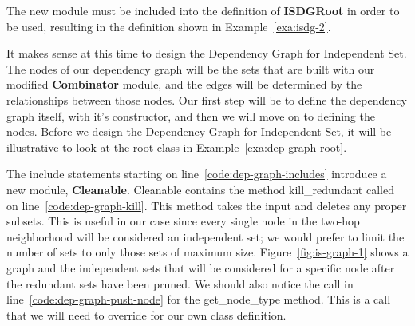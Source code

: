 The new module must be included into the definition of {\bf ISDGRoot} in order to be used, resulting in the definition shown in Example~\ref{exa:isdg-2}. 

  

It makes sense at this time to design the Dependency Graph for Independent Set. The nodes of our dependency graph will be the sets that are built with our modified {\bfseries Combinator} module, and the edges will be determined by the relationships between those nodes. Our first step will be to define the dependency graph itself, with it's constructor, and then we will move on to defining the nodes. Before we design the Dependency Graph for Independent Set, it will be illustrative to look at the root class in Example~\ref{exa:dep-graph-root}.



The {\ttfamily include} statements starting on line~\ref{code:dep-graph-includes} introduce a new module, {\bfseries Cleanable}. Cleanable contains the method {\ttfamily kill\_redundant} called on line~\ref{code:dep-graph-kill}. This method takes the input and deletes any proper subsets. This is useful in our case since every single node in the two-hop neighborhood will be considered an independent set; we would prefer to limit the number of sets to only those sets of maximum size. Figure~\ref{fig:is-graph-1} shows a graph and the independent sets that will be considered for a specific node after the redundant sets have been pruned. We should also notice the call in line~\ref{code:dep-graph-push-node} for the {\ttfamily get\_node\_type} method. This is a call that we will need to override for our own class definition. 




